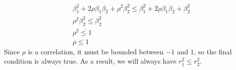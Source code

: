\documentclass[10pt]{article}
\begin{document}
\begin{itemize}
\begin{align}
        & \beta_1^2 + 2 \rho \beta_1 \beta_2 + \rho^2 \beta_2^2 \le \beta_1^2 + 2 \rho \beta_1 \beta_2 + \beta_2^2 \tag{expand left-hand side} \\
        & \rho^2 \beta_2^2 \le \beta_2^2 \tag{subtract \(\beta_1^2 + 2 \rho \beta_1 \beta_2\) from both sides} \\
        & \rho^2 \le 1 \tag{dibide both sides by \(\beta_2^2\)} \\
        & \rho \le 1 \tag{take the square root of both sides}
    \end{align}
    Since \(\rho\) is a correlation, it must be bounded between \(-1\) and \(1\), so the final condition is always true. As a result, we will always
    have \(r_1^2 \le r_2^2\).
\end{itemize}
\end{document}
